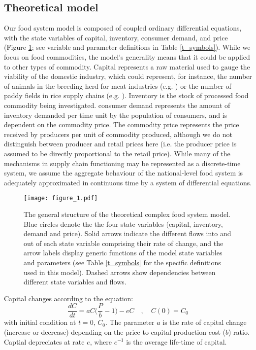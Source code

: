 \documentclass[12pt]{article}
\begin{document}
\subsection{Theoretical model}
Our food system model is composed of coupled ordinary differential equations, with the state variables of capital, inventory, consumer demand, and price (Figure \ref{fig_cfs}; see variable and parameter definitions in Table \ref{t_symbols}). While we focus on food commodities, the model's generality means that it could be applied to other types of commodity. Capital represents a raw material used to gauge the viability of the domestic industry, which could represent, for instance, the number of animals in the breeding herd for meat industries (e.g. \cite{meadows1971}) or the number of paddy fields in rice supply chains (e.g. \cite{chung2018}). Inventory is the stock of processed food commodity being investigated. consumer demand represents the amount of inventory demanded per time unit by the population of consumers, and is dependent on the commodity price. The commodity price represents the price received by producers per unit of commodity produced, although we do not distinguish between producer and retail prices here (i.e. the producer price is assumed to be directly proportional to the retail price). While many of the mechanisms in supply chain functioning may be represented as a discrete-time system, we assume the aggregate behaviour of the national-level food system is adequately approximated in continuous time by a system of differential equations.

\begin{figure}[t!]
  \centering
  \texttt{[image: figure\_1.pdf]}
  \caption{The general structure of the theoretical complex food system model. Blue circles denote the the four state variables (capital, inventory, demand and price). Solid arrows indicate the different flows into and out of each state variable comprising their rate of change, and the arrow labels display generic functions of the model state variables and parameters (see Table \ref{t_symbols} for the specific definitions used in this model). Dashed arrows show dependencies between different state variables and flows.}
  \label{fig_cfs}
\end{figure}

Capital changes according to the equation:
%
\begin{equation}
  \frac{dC}{dt} = a C \Big(\frac{P}{b} - 1\Big) - e C \quad, \quad C(0) = C_0
  \label{eq_capital}
\end{equation}
%
with initial condition at $t = 0$, $C_0$. The parameter $a$ is the rate of capital change (increase or decrease) depending on the price to capital production cost ($b$) ratio. Captial depreciates at rate $e$, where $e^{-1}$ is the average life-time of capital.
\end{document}
